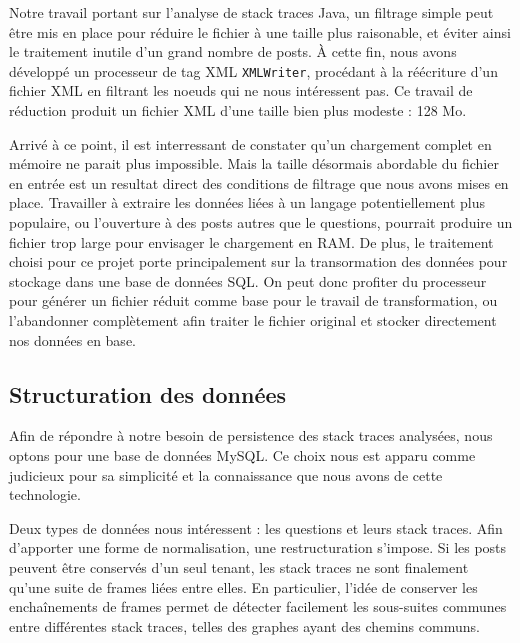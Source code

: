 \documentclass[11pt,a4paper]{article}
\begin{document}
Notre travail portant sur l'analyse de stack traces Java, un filtrage simple peut être mis en place pour réduire le fichier à une taille plus raisonable, et éviter ainsi le traitement inutile d'un grand nombre de posts.
À cette fin, nous avons développé un processeur de tag XML \texttt{XMLWriter}, procédant à la réécriture d'un fichier XML en filtrant les noeuds qui ne nous intéressent pas.
Ce travail de réduction produit un fichier XML d'une taille bien plus modeste : 128 Mo.
\newline

Arrivé à ce point, il est interressant de constater qu'un chargement complet en mémoire ne parait plus impossible.
Mais la taille désormais abordable du fichier en entrée est un resultat direct des conditions de filtrage que nous avons mises en place.
Travailler à extraire les données liées à un langage potentiellement plus populaire, ou l'ouverture à des posts autres que le questions, pourrait produire un fichier trop large pour envisager le chargement en RAM.
De plus, le traitement choisi pour ce projet porte principalement sur la transormation des données pour stockage dans une base de données SQL.
On peut donc profiter du processeur pour générer un fichier réduit comme base pour le travail de transformation, ou l'abandonner complètement afin traiter le fichier original et stocker directement nos données en base.

\subsection{Structuration des données}

Afin de répondre à notre besoin de persistence des stack traces analysées, nous optons pour une base de données MySQL.
Ce choix nous est apparu comme judicieux pour sa simplicité et la connaissance que nous avons de cette technologie.
\newline

Deux types de données nous intéressent : les questions et leurs stack traces.
Afin d'apporter une forme de normalisation, une restructuration s'impose.
Si les posts peuvent être conservés d'un seul tenant, les stack traces ne sont finalement qu'une suite de frames liées entre elles.
En particulier, l'idée de conserver les enchaînements de frames permet de détecter facilement les sous-suites communes entre différentes stack traces, telles des graphes ayant des chemins communs.
\newline
\end{document}
